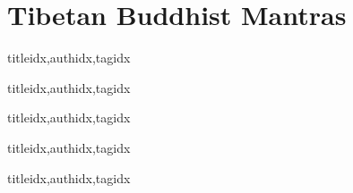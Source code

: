 \documentclass[twoside,10pt]{book}
\begin{document}
    \section{Tibetan Buddhist Mantras}
      \begin{songs}{titleidx,authidx,tagidx}
        \setcounter{songnum}{150}
        
      \end{songs}

  \clearpage\scleardpage
    \begin{songs}{titleidx,authidx,tagidx}
      \setcounter{songnum}{200}
      
    \end{songs}

  \clearpage\scleardpage
    \begin{songs}{titleidx,authidx,tagidx}
      \setcounter{songnum}{300}
      
    \end{songs}

  \clearpage\scleardpage
    \begin{songs}{titleidx,authidx,tagidx}
      \setcounter{songnum}{400}
      
    \end{songs}

  \clearpage\scleardpage
    \begin{songs}{titleidx,authidx,tagidx}
      \setcounter{songnum}{500}
      
    \end{songs}
\end{document}
